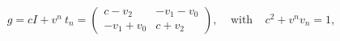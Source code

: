 \begin{equation}\label{g=c,v_n}
  g=cI+v^n~t_n= \left( \begin{array}{cr}
  c-v_2&-v_1-v_0\\-v_1+v_0&c+v_2 \end{array}\right),~~~~~\mbox{with}~~~~~
c^2+v^nv_n=1,
\end{equation}


